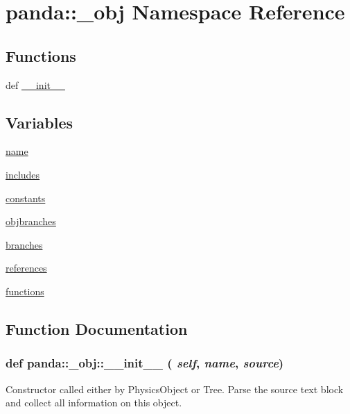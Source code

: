 \hypertarget{namespacepanda_1_1__obj}{
\section{panda::\_\-obj Namespace Reference}
\label{namespacepanda_1_1__obj}
}
\subsection*{Functions}
\begin{DoxyCompactItemize}
\item 
def \hyperlink{namespacepanda_1_1__obj_a72c97a2246cb0ddacab302857cb15773}{\_\-\_\-init\_\-\_\-}
\end{DoxyCompactItemize}
\subsection*{Variables}
\begin{DoxyCompactItemize}
\item 
\hyperlink{namespacepanda_1_1__obj_a6f9a6f4a89195851dbab26495423accc}{name}
\item 
\hyperlink{namespacepanda_1_1__obj_adf8459a2b90d494f33727f7a6f978cc5}{includes}
\item 
\hyperlink{namespacepanda_1_1__obj_a1a54bb10965b498c11547dba63c972b6}{constants}
\item 
\hyperlink{namespacepanda_1_1__obj_a2f64c2590fc9de34b7f2bde533e7d496}{objbranches}
\item 
\hyperlink{namespacepanda_1_1__obj_ac0dcf9ad909afd19a9c2f1664020dcdc}{branches}
\item 
\hyperlink{namespacepanda_1_1__obj_a25993535dedd7d0f68a6215c07d9ab41}{references}
\item 
\hyperlink{namespacepanda_1_1__obj_a48f29a17511665b50a1feb00c05d0572}{functions}
\end{DoxyCompactItemize}


\subsection{Function Documentation}
\hypertarget{namespacepanda_1_1__obj_a72c97a2246cb0ddacab302857cb15773}{
\subsubsection[{\_\-\_\-init\_\-\_\-}]{\setlength{\rightskip}{0pt plus 5cm}def panda::\_\-obj::\_\-\_\-init\_\-\_\- ( {\em self}, \/   {\em name}, \/   {\em source})}}
\label{namespacepanda_1_1__obj_a72c97a2246cb0ddacab302857cb15773}
\begin{DoxyVerb}
Constructor called either by PhysicsObject or Tree.
Parse the source text block and collect all information on this object.
\end{DoxyVerb}
 

